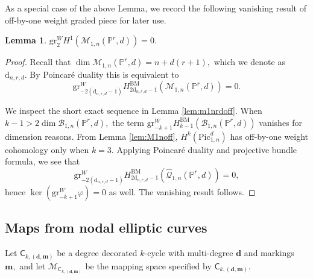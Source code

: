 \documentclass[12pt,reqno]{amsart}
\theoremstyle{definition}
\theoremstyle{definition}
\theoremstyle{definition}
\theoremstyle{definition}
\newtheorem{lemma}[theorem]{Lemma}
\newcommand{\gr}{\mathrm{gr}}
\begin{document}
As a special case of the above Lemma, we record the following vanishing result of off-by-one weight graded piece for later use.
\begin{lemma}\label{lem:H1wt2}
  $\gr^W_{2}H^1(\mathcal{M}_{1,n}(\mathbb{P}^r,d))=0.$
\end{lemma}
\begin{proof}
  Recall that $\dim \mathcal{M}_{1,n}(\mathbb{P}^r,d) = n + d(r+1),$ which we denote as $\mathrm{d}_{n,r,d}.$ By Poincaré duality this is equivalent to $$\gr^W_{-2(\mathrm{d}_{n,r,d}-1)}H^{\mathrm{BM}}_{2\mathrm{d}_{n,r,d}-1}(\mathcal{M}_{1,n}(\mathbb{P}^r,d))=0.$$

  We inspect the short exact sequence in Lemma \ref{lem:m1nrdoff}. When $k-1>2\dim \mathcal{B}_{1,n}(\mathbb{P}^r,d),$ the term $\mathrm{gr}^W_{-k+1}H^{\mathrm{BM}}_{k-1}(\mathcal{B}_{1,n}(\mathbb{P}^r,d))$ vanishes for dimension reasons. From Lemma \ref{lem:M1noff}, $H^k(\mathrm{Pic}_{1,n}^d)$ has off-by-one weight cohomology only when $k=3.$ Applying Poincaré duality and projective bundle formula, we see that $$\gr^W_{-2(\mathrm{d}_{n,r,d}-1)}H^{\mathrm{BM}}_{2\mathrm{d}_{n,r,d}-1}(\hat{\mathcal{Q}}_{1,n}(\mathbb{P}^r,d)) = 0,$$ hence $\ker(\gr^W_{-k+1}\varphi)=0$ as well. The vanishing result follows.
\end{proof}

\subsection{Maps from nodal elliptic curves}\label{sec:mapnod}
Let $\mathsf{C}_{k, (\mathbf{d}, \mathbf{m})}$ be a degree decorated $k$-cycle with multi-degree $\mathbf{d}$ and markings $\mathbf{m},$ and let $\mathcal{M}_{\mathsf{C}_{k, (\mathbf{d}, \mathbf{m})}}$ be the mapping space specified by $\mathsf{C}_{k, (\mathbf{d}, \mathbf{m})}.$
\end{document}

